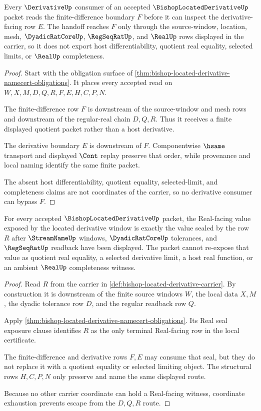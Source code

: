 \begin{theorem}
\label{thm:bishop-located-derivative-finite-difference-handoff}
Every $\DerivativeUp$ consumer of an accepted $\BishopLocatedDerivativeUp$ packet reads the finite-difference boundary $F$ before it can inspect the derivative-facing row $E$. The handoff reaches $F$ only through the source-window, location, mesh, $\DyadicRatCoreUp$, $\RegSeqRatUp$, and $\RealUp$ rows displayed in the carrier, so it does not export host differentiability, quotient real equality, selected limits, or $\RealUp$ completeness.
\end{theorem}
\begin{proof}
Start with the obligation surface of \autoref{thm:bishop-located-derivative-namecert-obligations}. It places every accepted read on $W,X,M,D,Q,R,F,E,H,C,P,N$.

The finite-difference row $F$ is downstream of the source-window and mesh rows and downstream of the regular-real chain $D,Q,R$. Thus it receives a finite displayed quotient packet rather than a host derivative.

The derivative boundary $E$ is downstream of $F$. Componentwise $\hsame$ transport and displayed $\Cont$ replay preserve that order, while provenance and local naming identify the same finite packet.

The absent host differentiability, quotient equality, selected-limit, and completeness claims are not coordinates of the carrier, so no derivative consumer can bypass $F$.
\end{proof}

\begin{theorem}
\label{thm:bishop-located-derivative-real-seal-nonescape}
For every accepted $\BishopLocatedDerivativeUp$ packet, the Real-facing value exposed by the located derivative window is exactly the value sealed by the row $R$ after $\StreamNameUp$ windows, $\DyadicRatCoreUp$ tolerances, and $\RegSeqRatUp$ readback have been displayed. The packet cannot re-expose that value as quotient real equality, a selected derivative limit, a host real function, or an ambient $\RealUp$ completeness witness.
\end{theorem}
\begin{proof}
Read $R$ from the carrier in \autoref{def:bishop-located-derivative-carrier}. By construction it is downstream of the finite source windows $W$, the local data $X,M$, the dyadic tolerance row $D$, and the regular readback row $Q$.

Apply \autoref{thm:bishop-located-derivative-namecert-obligations}. Its Real seal exposure clause identifies $R$ as the only terminal Real-facing row in the local certificate.

The finite-difference and derivative rows $F,E$ may consume that seal, but they do not replace it with a quotient equality or selected limiting object. The structural rows $H,C,P,N$ only preserve and name the same displayed route.

Because no other carrier coordinate can hold a Real-facing witness, coordinate exhaustion prevents escape from the $D,Q,R$ route.
\end{proof}

